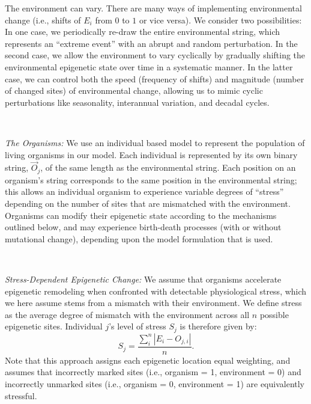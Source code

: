 \documentclass{article}
\begin{document}
The environment can vary. There are many ways of implementing environmental change (i.e., shifts of $E_i$ from $0$ to $1$ or vice versa). We consider two possibilities: In one case, we periodically re-draw the entire environmental string, which represents an ``extreme event'' with an abrupt and random perturbation. In the second case, we allow the environment to vary cyclically by gradually shifting the environmental epigenetic state over time in a systematic manner. In the latter case, we can control both the speed (frequency of shifts) and magnitude (number of changed sites) of environmental change, allowing us to mimic cyclic perturbations like seasonality, interannual variation, and decadal cycles.

\ 


\noindent \textit{The Organisms:} We use an individual based model to represent the population of living organisms in our model. Each individual is represented by its own binary string, $\vec{O}_j$, of the same length as the environmental string. Each position on an organism's string corresponds to the same position in the environmental string; this allows an individual organism to experience variable degrees of ``stress'' depending on the number of sites that are mismatched with the environment. Organisms can modify their epigenetic state according to the mechanisms outlined below, and may experience birth-death processes (with or without mutational change), depending upon the model formulation that is used. %

\ 

\noindent \textit{Stress-Dependent Epigenetic Change:} We assume that organisms accelerate epigenetic remodeling when confronted with detectable physiological stress, which we here assume stems from a mismatch with their environment. We define stress as the average degree of mismatch with the environment across all $n$ possible epigenetic sites. Individual $j$'s level of stress $S_j$ is therefore given by:
\begin{equation}
   S_j = \frac{\sum_i ^n | E_i - O_{j,i} |}{n} .
\end{equation}
Note that this approach assigns each epigenetic location equal weighting, and assumes that incorrectly marked sites (i.e., organism = 1, environment = 0) and incorrectly unmarked sites (i.e., organism = 0, environment = 1) are equivalently stressful.
\end{document}

